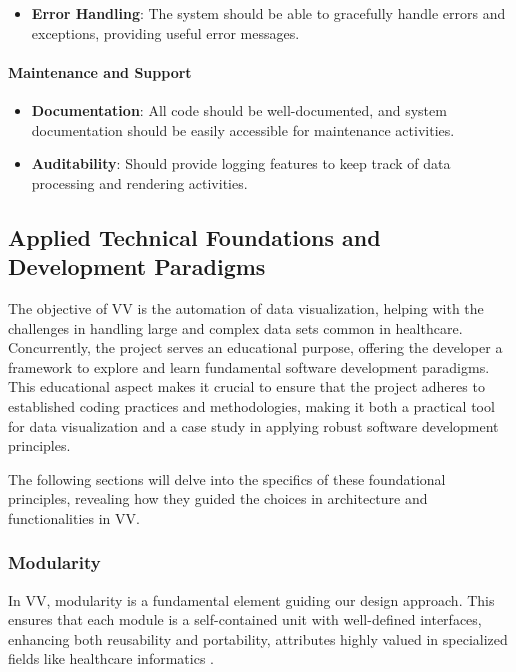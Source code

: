 \begin{itemize}
\item
  \textbf{Error Handling}: The system should be able to gracefully
  handle errors and exceptions, providing useful error messages.
\end{itemize}

\paragraph{Maintenance and Support}\label{maintenance-and-support}

\begin{itemize}
\item
  \textbf{Documentation}: All code should be well-documented, and system
  documentation should be easily accessible for maintenance activities.
\item
  \textbf{Auditability}: Should provide logging features to keep track
  of data processing and rendering activities.
\end{itemize}

\subsection{Applied Technical Foundations and Development Paradigms}\label{technical-foundations-and-development-paradigms}

The objective of VV is the automation of data visualization, helping
with the challenges in handling large and complex data sets common in
healthcare. Concurrently, the project serves an educational purpose,
offering the developer a framework to explore and learn fundamental
software development paradigms. This educational aspect makes it crucial
to ensure that the project adheres to established coding practices and
methodologies, making it both a practical tool for data visualization
and a case study in applying robust software development principles.

The following sections will delve into the specifics of these
foundational principles, revealing how they guided the choices in
architecture and functionalities in VV.

\subsubsection{Modularity}\label{modularity}

In VV, modularity is a fundamental element guiding our design approach.
This ensures that each module is a self-contained unit with well-defined
interfaces, enhancing both reusability and portability, attributes
highly valued in specialized fields like healthcare informatics
\cite{39}.

